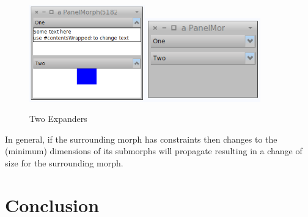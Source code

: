 \documentclass[a4paper,10pt,twoside]{book}
\begin{document}
\begin{figure}[ht]\centering
	\includegraphics[width=5cm]{expanded}\includegraphics[width=5cm]{expanded2}
	\caption{Two Expanders }
	\label{fig:expanders}
\end{figure}


In general, if the surrounding morph has  constraints then changes to the (minimum) dimensions of its submorphs will propagate resulting in a change of size for the surrounding morph.



\section{Conclusion}

\ifx\wholebook\relax\else
   
   
\end{document}
